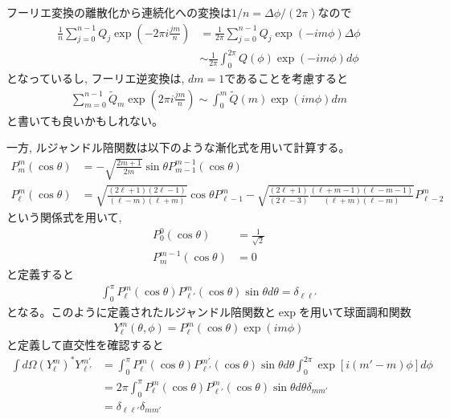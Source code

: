 \documentclass[a4j, 12pt]{ltjarticle}
\begin{document}
    フーリエ変換の離散化から連続化への変換は$1/n = \Delta \phi/(2\pi)$なので
    \begin{align}
        \frac{1}{n}\sum_{j=0}^{n-1}Q_j \exp\left(-2\pi i \frac{jm}{n}\right)
        &= \frac{1}{2\pi}\sum_{j=0}^{n-1}Q_j\exp\left(-im\phi \right) \Delta \phi \\
        &\sim \frac{1}{2\pi}\int_0^{2\pi} Q(\phi) \exp(-im\phi)d\phi
    \end{align}
    となっているし, フーリエ逆変換は, $dm = 1$であることを考慮すると
    \begin{align}
        \sum_{m=0}^{n-1}\tilde{Q}_m\exp\left(2\pi i \frac{jm}{n}\right) \sim
        \int_0^m \tilde{Q}(m) \exp\left(im\phi\right) dm
    \end{align}
    と書いても良いかもしれない。
    \par
    一方, ルジャンドル陪関数は以下のような漸化式を用いて計算する。
    \begin{align}
        P^m_m(\cos\theta) &= -\sqrt{\frac{2m+1}{2m}}\sin\theta P_{m-1}^{m-1}(\cos\theta) \\
        P^m_\ell (\cos\theta) &= \sqrt{\frac{(2\ell+1)(2\ell-1)}{(\ell - m)(\ell + m)}}\cos\theta P_{\ell-1}^m
        - \sqrt{\frac{(2\ell+1)}{(2\ell-3)}\frac{(\ell + m - 1)(\ell - m - 1)}{(\ell + m)(\ell - m)}}P_{\ell-2}^m
    \end{align}
    という関係式を用いて, 
    \begin{align}
        P_0^0(\cos\theta) &= \frac{1}{\sqrt{2}} \\
        P_m^{m-1}(\cos\theta) &= 0
    \end{align}
    と定義すると
    \begin{align}
        \int_0^\pi P_\ell^m(\cos\theta)P_{\ell'}^m(\cos\theta) \sin\theta d\theta = \delta_{\ell\ell'}
    \end{align}
    となる。このように定義されたルジャンドル陪関数と$\exp$を用いて球面調和関数
    \begin{align}
        Y_\ell^m(\theta,\phi) = P_\ell^m (\cos\theta)\exp(im\phi)
    \end{align}
    と定義して直交性を確認すると
    \begin{align}
        \int d\Omega (Y_\ell^m)^* Y_{\ell'}^{m'} &=
        \int_0^{\pi} P_\ell^m(\cos\theta)P_{\ell'}^{m'}(\cos\theta)\sin\theta d\theta 
        \int_0^{2\pi} \exp\left[i(m'-m)\phi\right] d\phi \\
        &= 2\pi\int_0^{\pi} P_\ell^m(\cos\theta)P_{\ell'}^{m}(\cos\theta)\sin\theta d\theta \delta_{mm'} \\
        & = \delta_{\ell\ell'}\delta_{mm'}
    \end{align}
\end{document}
